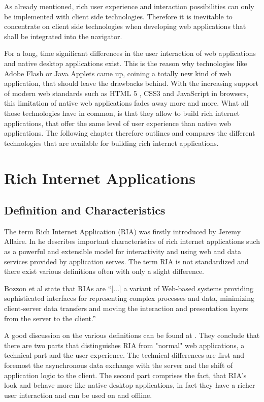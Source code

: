 As already mentioned, rich user experience and interaction possibilities can only be implemented with client side technologies. Therefore it is inevitable to concentrate on client side technologies when developing web applications that shall be integrated into the navigator.

For a long, time significant differences in the user interaction of web applications and native desktop applications exist.
This is the reason why technologies like Adobe Flash or Java Applets came up, coining a totally new kind of web application, that should leave the drawbacks behind. With the increasing support of modern web standards such as HTML 5 , CSS3 and JavaScript in browsers, this limitation of native web applications fades away more and more. What all those technologies have in common, is that they allow to build rich internet applications, that offer the same level of user experience than native web applications. The following chapter therefore outlines and compares the different technologies that are available for building rich internet applications.


\section{Rich Internet Applications}

\subsection{Definition and Characteristics}

The term Rich Internet Application (RIA) was firstly introduced by Jeremy Allaire.
In \autocite[]{allaire_ria} he describes important characteristics of rich internet applications such as a powerful and extensible model for interactivity and using web and data services provided by application serves.
The term RIA is not standardized and there exist various definitions often with only a slight difference.


Bozzon et al state that RIAs are  \enquote{[...] a variant of Web-based systems providing sophisticated interfaces for representing complex processes and data, minimizing client-server data transfers and moving the interaction and presentation layers from the server to the client.} \autocite[]{ria-definition-1}
 
A good discussion on the various definitions can be found at \autocite[]{ria-state-of-the-art}.
They conclude that there are two parts that distinguishes RIA from "normal" web applications, a technical part and the user experience.
The technical differences are first and foremost the asynchronous data exchange with the server and the shift of application logic to the client.
The second part comprises the fact, that RIA's look and behave more like native desktop applications, in fact they have a richer user interaction and can be used on and offline.
 
